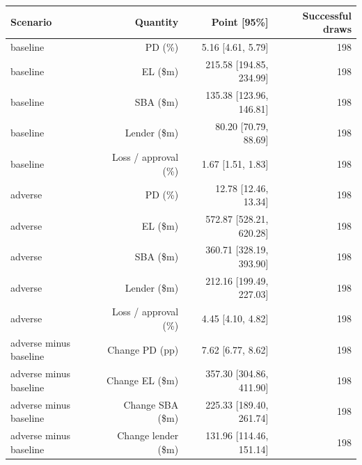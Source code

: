 \begingroup\small\setlength{\tabcolsep}{3pt}
\begin{tabularx}{\linewidth}{Xrrr}\toprule
Scenario & Quantity & Point [95\%] & Successful draws \\ \midrule
baseline & PD (\%) & 5.16 [4.61, 5.79] & 198 \\
baseline & EL (\$m) & 215.58 [194.85, 234.99] & 198 \\
baseline & SBA (\$m) & 135.38 [123.96, 146.81] & 198 \\
baseline & Lender (\$m) & 80.20 [70.79, 88.69] & 198 \\
baseline & Loss / approval (\%) & 1.67 [1.51, 1.83] & 198 \\
adverse & PD (\%) & 12.78 [12.46, 13.34] & 198 \\
adverse & EL (\$m) & 572.87 [528.21, 620.28] & 198 \\
adverse & SBA (\$m) & 360.71 [328.19, 393.90] & 198 \\
adverse & Lender (\$m) & 212.16 [199.49, 227.03] & 198 \\
adverse & Loss / approval (\%) & 4.45 [4.10, 4.82] & 198 \\
adverse minus baseline & Change PD (pp) & 7.62 [6.77, 8.62] & 198 \\
adverse minus baseline & Change EL (\$m) & 357.30 [304.86, 411.90] & 198 \\
adverse minus baseline & Change SBA (\$m) & 225.33 [189.40, 261.74] & 198 \\
adverse minus baseline & Change lender (\$m) & 131.96 [114.46, 151.14] & 198 \\
\bottomrule\end{tabularx}\endgroup
